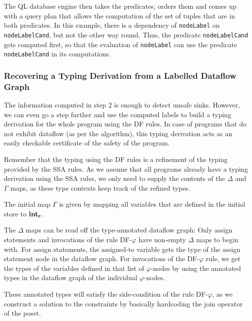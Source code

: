 The QL database engine then takes the predicates, orders them and comes up with 
a query plan that allows the computation of the set of tuples that are in both predicates.
In this example, there is a dependency of \texttt{nodeLabel} on \texttt{nodeLabelCand},
but not the other way round.
Thus, the predicate \texttt{nodeLabelCand} gets computed first, so that the evaluation
of \texttt{nodeLabel} can use the predicate \texttt{nodeLabelCand} in its computations.


\subsubsection*{Recovering a Typing Derivation from a Labelled Dataflow Graph}
The information computed in step 2 is enough to detect unsafe sinks.
However, we can even go a step further and use the computed labels to build a
typing derivation for the whole program using the DF rules.
In case of programs that do not exhibit dataflow (as per the algorithm), this
typing derivation acts as an easily checkable certificate of the safety of the program.

Remember that the typing using the DF rules is a refinement of the typing provided 
by the SSA rules.
As we assume that all programs already have a typing derivation using the SSA rules,
we only need to supply the contents of the $\Delta$ and $\Gamma$ maps, as these 
type contexts keep track of the refined types.

The initial map $\Gamma$ is given by mapping all variables that are defined in 
the initial store to $\textbf{int}_\textbf{c}$.

The $\Delta$ maps can be read off the type-annotated dataflow graph:
Only assign statements and invocations of the rule \textsc{DF-$\varphi$}
have non-empty $\Delta$ maps to begin with.
For assign statements, the assigned-to variable gets the type of the assign statement 
node in the dataflow graph.
For invocations of the \textsc{DF-$\varphi$} rule, we get the types of the 
variables defined in that list of $\varphi$-nodes by using the annotated
types in the dataflow graph of the individual $\varphi$-nodes.

These annotated types will satisfy the side-condition of the rule \textsc{DF-$\varphi$},
as we construct a solution to the constraints by basically hardcoding the join operator
of the poset.

